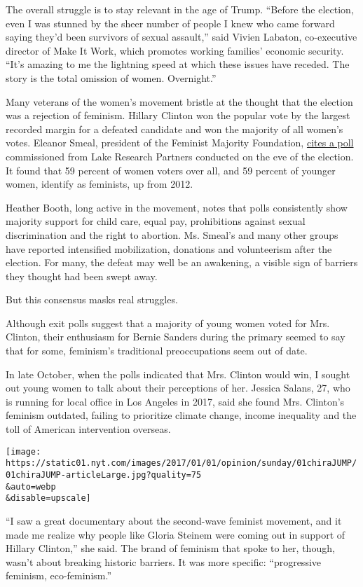 The overall struggle is to stay relevant in the age of Trump. ``Before
the election, even I was stunned by the sheer number of people I knew
who came forward saying they'd been survivors of sexual assault,'' said
Vivien Labaton, co-executive director of Make It Work, which promotes
working families' economic security. ``It's amazing to me the lightning
speed at which these issues have receded. The story is the total
omission of women. Overnight.''

Many veterans of the women's movement bristle at the thought that the
election was a rejection of feminism. Hillary Clinton won the popular
vote by the largest recorded margin for a defeated candidate and won the
majority of all women's votes. Eleanor Smeal, president of the Feminist
Majority Foundation,
\href{http://msmagazine.com/blog/2016/12/22/numbers-gender-feminism-2016-presidential-election/}{cites
a poll} commissioned from Lake Research Partners conducted on the eve of
the election. It found that 59 percent of women voters over all, and 59
percent of younger women, identify as feminists, up from 2012.

Heather Booth, long active in the movement, notes that polls
consistently show majority support for child care, equal pay,
prohibitions against sexual discrimination and the right to abortion.
Ms. Smeal's and many other groups have reported intensified
mobilization, donations and volunteerism after the election. For many,
the defeat may well be an awakening, a visible sign of barriers they
thought had been swept away.

But this consensus masks real struggles.

Although exit polls suggest that a majority of young women voted for
Mrs. Clinton, their enthusiasm for Bernie Sanders during the primary
seemed to say that for some, feminism's traditional preoccupations seem
out of date.

In late October, when the polls indicated that Mrs. Clinton would win, I
sought out young women to talk about their perceptions of her. Jessica
Salans, 27, who is running for local office in Los Angeles in 2017, said
she found Mrs. Clinton's feminism outdated, failing to prioritize
climate change, income inequality and the toll of American intervention
overseas.

\texttt{[image: https://static01.nyt.com/images/2017/01/01/opinion/sunday/01chiraJUMP/01chiraJUMP-articleLarge.jpg?quality=75\\\&auto=webp\\\&disable=upscale]}

``I saw a great documentary about the second-wave feminist movement, and
it made me realize why people like Gloria Steinem were coming out in
support of Hillary Clinton,'' she said. The brand of feminism that spoke
to her, though, wasn't about breaking historic barriers. It was more
specific: ``progressive feminism, eco-feminism.''

